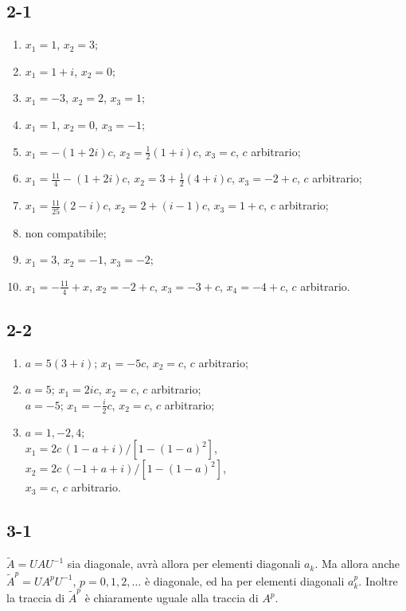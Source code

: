 \documentclass[11pt, a4paper]{book}
\numberwithin{equation}{section}
\begin{document}
\subsection*{2-1}
\begin{enumerate}
  \item $x_1 = 1$, $x_2 = 3$;
  \item $x_1 = 1+i$, $x_2 = 0$;
  \item $x_1 = -3$, $x_2 = 2$, $x_3 = 1$; %


  \item $x_1 = 1$, $x_2 = 0$, $x_3 = -1$;
  \item $x_1 = -(1+2i)c$, $x_2 = \frac{1}{2}(1+i)c$, $x_3 = c$,
        \quad $c$ arbitrario;
  \item $x_1 = \frac{11}{4}-(1+2i)c$, $x_2 = 3+\frac{1}{2}(4+i)c$,
        $x_3 = -2+c$, \quad $c$ arbitrario;
  \item $x_1 = \frac{11}{25}(2-i)c$, $x_2 = 2+(i-1)c$, $x_3 = 1+c$,
        \quad $c$ arbitrario; %
  \item non compatibile;
  \item $x_1 = 3$, $x_2 = -1$, $x_3 = -2$;
  \item $x_1 = -\frac{11}{4}+x$, $x_2 = -2+c$, $x_3 = -3+c$,
        $x_4 = -4+c$, \quad $c$ arbitrario.
\end{enumerate}

\subsection*{2-2}
\begin{enumerate}
  \item $a = 5(3+i)$; $x_1 = -5c$, $x_2 = c$, \quad $c$ arbitrario;
  \item $a = 5$; $x_1 = 2ic$, $x_2 = c$, \quad $c$ arbitrario;\\
        $a = -5$; $x_1 = -\frac{i}{2}c$, $x_2 = c$, \quad $c$ arbitrario;
  \item $a = 1, -2, 4$;\\
        $x_1 = 2c\,(1-a+i)/[1-(1-a)^2]$,\\
        $x_2 = 2c\,(-1+a+i)/[1-(1-a)^2]$,\\
        $x_3 = c$, \quad $c$ arbitrario.
\end{enumerate}

\subsection*{3-1}
$\widetilde{A} = UAU^{-1}$ sia diagonale, avrà allora per elementi
diagonali $a_k$. Ma allora anche $\widetilde{A}^p = UA^pU^{-1}$,
$p=0,1,2,\ldots$ è diagonale, ed ha per elementi diagonali $a_k^p$.
Inoltre la traccia di $\widetilde{A}^p$ è chiaramente uguale alla traccia
di $A^p$.
\end{document}
